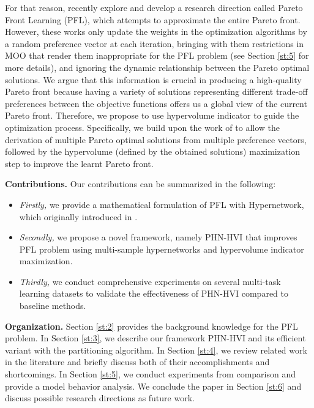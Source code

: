 \documentclass[letterpaper]{article} %
\newcommand{\ourmodel}{PHN-HVI }
\begin{document}
For that reason, \cite{controllable, navon2021learning, ruchte2021scalable} recently explore and develop a research direction called Pareto Front Learning (PFL), which attempts to approximate the entire Pareto front. However, these works only update the weights in the optimization algorithms by a random preference vector at each iteration, bringing with them restrictions in MOO that render them inappropriate for the PFL problem (see Section \ref{st:5} for more details), and ignoring the dynamic relationship between the Pareto optimal solutions. We argue that this information is crucial in producing a high-quality Pareto front because having a variety of solutions representing different trade-off preferences between the objective functions offers us a global view of the current Pareto front. Therefore, we propose to use hypervolume indicator to guide the optimization process. Specifically, we build upon the work of \cite{navon2021learning} to allow the derivation of multiple Pareto optimal solutions from multiple preference vectors, followed by the hypervolume (defined by the obtained solutions) maximization step to improve the learnt Pareto front.

{\bf Contributions.} Our contributions can be summarized in the following:
\begin{itemize}
\item \emph{Firstly,} we provide a mathematical formulation of PFL with Hypernetwork, which originally introduced in \cite{navon2021learning}.
\item \emph{Secondly,} we propose a novel framework, namely \ourmodel that improves PFL problem using multi-sample hypernetworks and hypervolume indicator maximization.
\item \emph{Thirdly,} we conduct comprehensive experiments on several multi-task learning datasets to validate the effectiveness of \ourmodel compared to baseline methods.
\end{itemize}

{\bf Organization.} Section \ref{st:2} provides the background knowledge for the PFL problem. In Section \ref{st:3}, we describe our framework \ourmodel and its efficient variant with the partitioning algorithm. In Section \ref{st:4}, we review related work in the literature and briefly discuss both of their accomplishments and shortcomings. In Section \ref{st:5}, we conduct experiments from comparison and provide a model behavior analysis. We conclude the paper in Section \ref{st:6} and discuss possible research directions as future work.
\end{document}
